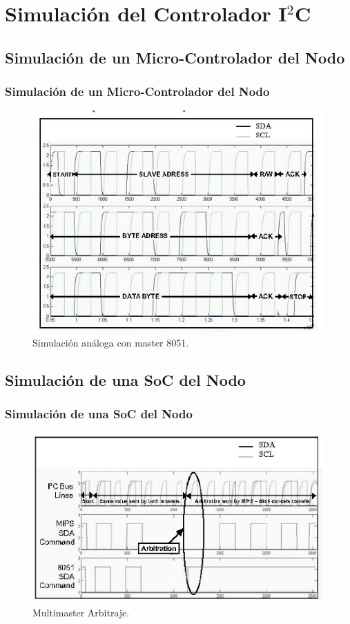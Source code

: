 \documentclass[pstricks,serif, 10pt]{beamer}
\begin{document}
\section[Simulación]{Simulación del Controlador I$^2$C}
\subsection[Micro-Controlador]{Simulación de un Micro-Controlador del Nodo}
\begin{frame}
 \frametitle{Simulación de un Micro-Controlador del Nodo}
 \begin{figure}[H]
  \centering
    \includegraphics[scale=0.5]{sim1.png}
      \caption{Simulación análoga con master 8051.}
	\label{fig5}
\end{figure}  
\end{frame}

\subsection[SoC]{Simulación de una SoC del Nodo}
\begin{frame}
 \frametitle{Simulación de una SoC del Nodo}
 \begin{figure}[H]
  \centering
    \includegraphics[scale=0.6]{sim2.png}
      \caption{Multimaster Arbitraje.}
	\label{fig5}
\end{figure}  
\end{frame}
\end{document}
